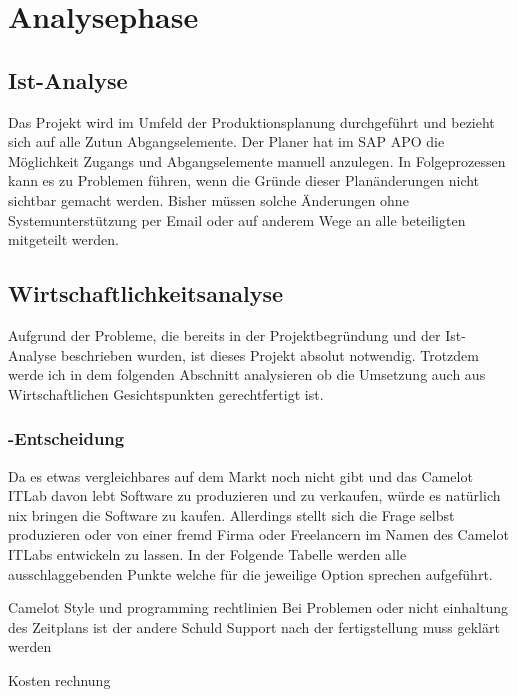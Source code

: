 \section{Analysephase} 
\label{sec:Analysephase}

\subsection{Ist-Analyse} 
\label{sec:IstAnalyse}
Das Projekt wird im Umfeld der Produktionsplanung durchgeführt und bezieht sich auf alle Zutun Abgangselemente. Der Planer hat im SAP \ac{APO} die	Möglichkeit Zugangs und Abgangselemente manuell anzulegen. In Folgeprozessen kann es zu	Problemen führen, wenn die Gründe dieser Planänderungen nicht sichtbar gemacht werden. Bisher müssen solche Änderungen ohne Systemunterstützung per Email oder auf anderem Wege an alle beteiligten mitgeteilt werden.

\subsection{Wirtschaftlichkeitsanalyse}
\label{sec:Wirtschaftlichkeitsanalyse}
Aufgrund der Probleme, die bereits in der Projektbegründung und der Ist-Analyse beschrieben wurden, ist dieses Projekt absolut notwendig. Trotzdem werde ich in dem folgenden Abschnitt analysieren ob die Umsetzung auch aus Wirtschaftlichen Gesichtspunkten gerechtfertigt ist.

\subsubsection{-Entscheidung}
\label{sec:MakeOrBuyEntscheidung}

Da es etwas vergleichbares auf dem Markt noch nicht gibt und das Camelot ITLab davon lebt Software zu produzieren und zu verkaufen, würde es natürlich nix bringen die Software zu kaufen. Allerdings stellt sich die Frage selbst produzieren oder von einer fremd Firma oder Freelancern im Namen des Camelot ITLabs entwickeln zu lassen. In der Folgende Tabelle werden alle ausschlaggebenden Punkte welche für die jeweilige Option sprechen aufgeführt.

Camelot Style und programming rechtlinien								Bei Problemen oder nicht einhaltung des Zeitplans
																	    ist der andere Schuld
Support nach der fertigstellung muss geklärt werden

Kosten rechnung

